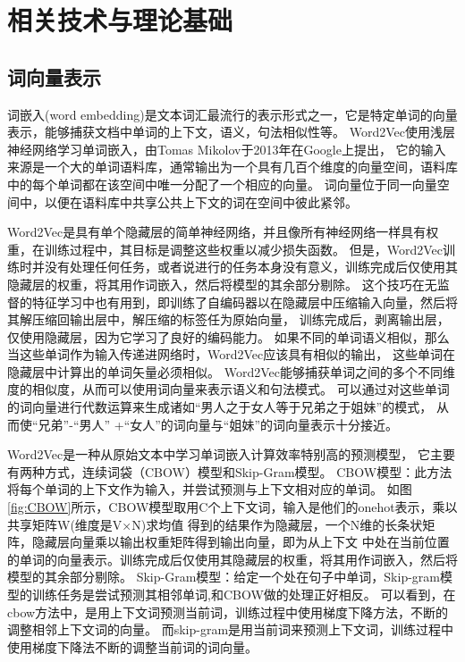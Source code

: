 \chapter{相关技术与理论基础}

\section{词向量表示}

词嵌入(word embedding)是文本词汇最流行的表示形式之一，它是特定单词的向量表示，能够捕获文档中单词的上下文，语义，句法相似性等。
Word2Vec使用浅层神经网络学习单词嵌入，由Tomas Mikolov于2013年在Google上提出\cite{mikolov2013distributed}，
它的输入来源是一个大的单词语料库，通常输出为一个具有几百个维度的向量空间，语料库中的每个单词都在该空间中唯一分配了一个相应的向量。 
词向量位于同一向量空间中，以便在语料库中共享公共上下文的词在空间中彼此紧邻。 

  Word2Vec是具有单个隐藏层的简单神经网络，并且像所有神经网络一样具有权重，在训练过程中，其目标是调整这些权重以减少损失函数\cite{goldberg2014word2vec}。 
  但是，Word2Vec训练时并没有处理任何任务，或者说进行的任务本身没有意义，训练完成后仅使用其隐藏层的权重，将其用作词嵌入，然后将模型的其余部分剔除。
  这个技巧在无监督的特征学习中也有用到，即训练了自编码器以在隐藏层中压缩输入向量，然后将其解压缩回输出层中，解压缩的标签任为原始向量，
  训练完成后，剥离输出层，仅使用隐藏层，因为它学习了良好的编码能力。
  如果不同的单词语义相似，那么当这些单词作为输入传递进网络时，Word2Vec应该具有相似的输出，
  这些单词在隐藏层中计算出的单词矢量必须相似。
Word2Vec能够捕获单词之间的多个不同维度的相似度，从而可以使用词向量来表示语义和句法模式。
可以通过对这些单词的词向量进行代数运算来生成诸如“男人之于女人等于兄弟之于姐妹”的模式，
从而使“兄弟”-“男人” +“女人”的词向量与“姐妹”的词向量表示十分接近。

Word2Vec是一种从原始文本中学习单词嵌入计算效率特别高的预测模型，
它主要有两种方式，连续词袋（CBOW）模型和Skip-Gram模型。
CBOW模型：此方法将每个单词的上下文作为输入，并尝试预测与上下文相对应的单词。
如图\ref{fig:CBOW}所示，CBOW模型取用C个上下文词，输入是他们的onehot表示，乘以共享矩阵W(维度是V×N)求均值
得到的结果作为隐藏层，一个N维的长条状矩阵，隐藏层向量乘以输出权重矩阵得到输出向量，即为从上下文
中处在当前位置的单词的向量表示。训练完成后仅使用其隐藏层的权重，将其用作词嵌入，然后将模型的其余部分剔除。
Skip-Gram模型：给定一个处在句子中单词，Skip-gram模型的训练任务是尝试预测其相邻单词,和CBOW做的处理正好相反。
可以看到，在cbow方法中，是用上下文词预测当前词，训练过程中使用梯度下降方法，不断的调整相邻上下文词的向量。
而skip-gram是用当前词来预测上下文词，训练过程中使用梯度下降法不断的调整当前词的词向量。

